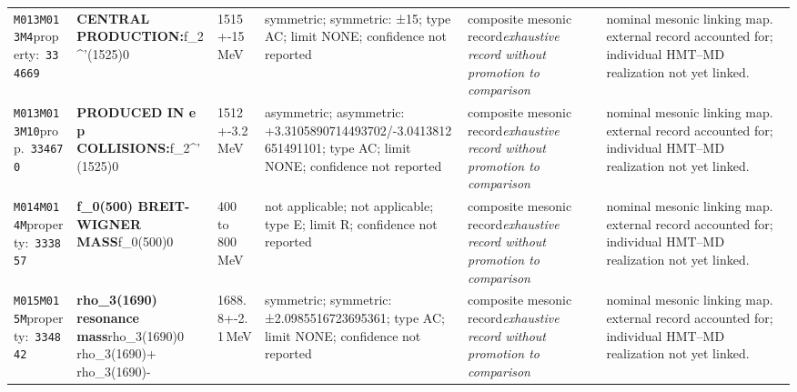 \begin{landscape}
\begin{longtable}{L{1.85cm}L{4.45cm}L{2.35cm}L{4.05cm}L{3.35cm}L{7.15cm}}
\texttt{M013}\newline \texttt{M013M4}\newline property:\ \texttt{334669} & \textbf{CENTRAL PRODUCTION:}\newline f\_\allowbreak{}2\textasciicircum{}'(1525)0 & 1515+-15\,MeV & symmetric; symmetric: ±15; type AC; limit NONE; confidence not reported & composite mesonic record\newline \emph{exhaustive record without promotion to comparison} & nominal mesonic linking map. external record accounted for; individual HMT--MD realization not yet linked. \\
\texttt{M013}\newline \texttt{M013M10}\newline prop.\ \texttt{334670} & \textbf{PRODUCED IN e p COLLISIONS:}\newline f\_\allowbreak{}2\textasciicircum{}'(1525)0 & 1512+-3.2\,MeV & asymmetric; asymmetric: +3.3105890714493702/-3.0413812651491101; type AC; limit NONE; confidence not reported & composite mesonic record\newline \emph{exhaustive record without promotion to comparison} & nominal mesonic linking map. external record accounted for; individual HMT--MD realization not yet linked. \\
\texttt{M014}\newline \texttt{M014M}\newline property:\ \texttt{333857} & \textbf{f\_\allowbreak{}0(500) BREIT-WIGNER MASS}\newline f\_\allowbreak{}0(500)0 & 400 to 800\,MeV & not applicable; not applicable; type E; limit R; confidence not reported & composite mesonic record\newline \emph{exhaustive record without promotion to comparison} & nominal mesonic linking map. external record accounted for; individual HMT--MD realization not yet linked. \\
\texttt{M015}\newline \texttt{M015M}\newline property:\ \texttt{334842} & \textbf{rho\_\allowbreak{}3(1690) resonance mass}\newline rho\_\allowbreak{}3(1690)0 \textbar{}\allowbreak{} rho\_\allowbreak{}3(1690)+ \textbar{}\allowbreak{} rho\_\allowbreak{}3(1690)- & 1688.8+-2.1\,MeV & symmetric; symmetric: ±2.0985516723695361; type AC; limit NONE; confidence not reported & composite mesonic record\newline \emph{exhaustive record without promotion to comparison} & nominal mesonic linking map. external record accounted for; individual HMT--MD realization not yet linked. \\

\end{longtable}
\end{landscape}
